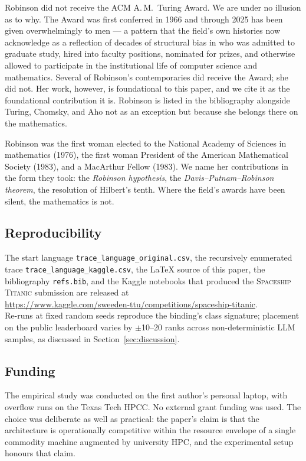 Robinson did not receive the ACM A.\,M.\ Turing Award.  We are
under no illusion as to why.  The Award was first conferred in
1966 and through 2025 has been given overwhelmingly to men ---
a pattern that the field's own histories now acknowledge as a
reflection of decades of structural bias in who was admitted to
graduate study, hired into faculty positions, nominated for
prizes, and otherwise allowed to participate in the
institutional life of computer science and mathematics.
Several of Robinson's contemporaries did receive the Award; she
did not.  Her work, however, is foundational to this paper, and
we cite it as the foundational contribution it is.  Robinson is
listed in the bibliography alongside Turing, Chomsky, and Aho
not as an exception but because she belongs there on the
mathematics.

Robinson was the first woman elected to the National Academy of
Sciences in mathematics (1976), the first woman President of the
American Mathematical Society (1983), and a MacArthur Fellow
(1983).  We name her contributions in the form they took: the
\emph{Robinson hypothesis}, the
\emph{Davis--Putnam--Robinson theorem}, the resolution of
Hilbert's tenth.  Where the field's awards have been silent, the
mathematics is not.

\subsection*{Reproducibility}

The start language \texttt{trace\_language\_original.csv}, the
recursively enumerated trace \texttt{trace\_language\_kaggle.csv},
the \LaTeX{} source of this paper, the bibliography
\texttt{refs.bib}, and the Kaggle notebooks that produced the
\textsc{Spaceship Titanic} submission are released at\\
\url{https://www.kaggle.com/sweeden-ttu/competitions/spaceship-titanic}.\\
Re-runs at fixed random seeds reproduce the binding's class
signature; placement on the public leaderboard varies by
$\pm$10--20 ranks across non-deterministic LLM samples, as
discussed in Section~\ref{sec:discussion}.

\subsection*{Funding}

The empirical study was conducted on the first author's personal
laptop, with overflow runs on the Texas Tech HPCC.  No external
grant funding was used.  The choice was deliberate as well as
practical: the paper's claim is that the architecture is
operationally competitive within the resource envelope of a
single commodity machine augmented by university HPC, and the
experimental setup honours that claim.
